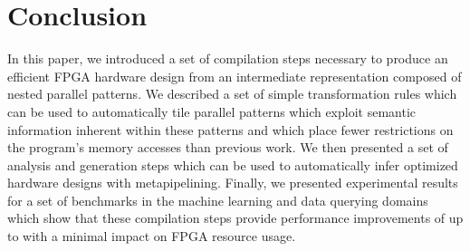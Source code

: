 \documentclass[pageno]{jpaper}
\begin{document}
 \section{Conclusion}
In this paper, we introduced a set of compilation steps necessary
to produce an efficient FPGA hardware design from an intermediate representation composed of nested parallel patterns.
We described a set of simple transformation rules which can be used to automatically
tile parallel patterns which exploit semantic information inherent within these patterns
and which place fewer restrictions on the program's memory accesses than previous work.
We then presented a set of analysis and generation steps which can be used to automatically infer
optimized hardware designs with metapipelining.
Finally, we presented experimental results for a set of benchmarks in the machine learning and data querying
domains which show that these compilation steps provide performance improvements of up to  with a minimal impact on FPGA resource usage.
 


\end{document}
